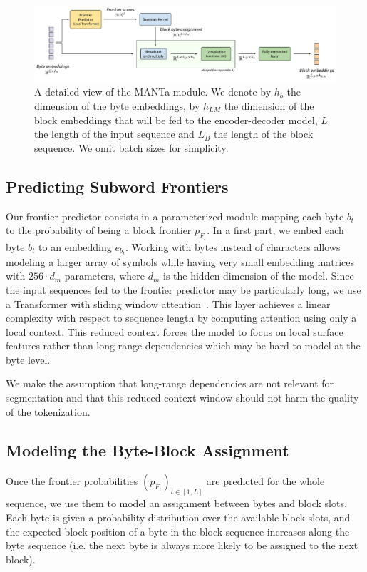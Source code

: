 \begin{figure}[!t]
    \centering
    \includegraphics[width=0.9\linewidth]{sources/part_2/manta/images/MANTa_Tokenization_Module.pdf}
    \caption{A detailed view of the MANTa module. We denote by $h_b$ the dimension of the byte embeddings, by $h_{LM}$ the dimension of the block embeddings that will be fed to the encoder-decoder model, $L$ the length of the input sequence and $L_B$ the length of the block sequence. We omit batch sizes for simplicity.}
    \label{fig:detailled_diagram}
\end{figure}

\subsection{Predicting Subword Frontiers}
\label{sec:frontpred}
Our frontier predictor consists in a parameterized module mapping each byte $b_t$ to the probability of being a block frontier $p_{F_t}$. In a first part, we embed each byte $b_t$ to an embedding $e_{b_t}$. Working with bytes instead of characters allows modeling a larger array of symbols while having very small embedding matrices with $256\cdot d_m$ parameters, where $d_m$ is the hidden dimension of the model. Since the input sequences fed to the frontier predictor may be particularly long, we use a Transformer with sliding window attention~\citep{beltagy2020longformer}. This layer achieves a linear complexity with respect to sequence length by computing attention using only a local context. This reduced context forces the model to focus on local surface features rather than long-range dependencies which may be hard to model at the byte level.

We make the assumption that long-range dependencies are not relevant for segmentation and that this reduced context window should not harm the quality of the tokenization.


\subsection{Modeling the Byte-Block Assignment}
\label{ssec:manta_maths}
Once the frontier probabilities $(p_{F_t})_{t \in [1, L]}$ are predicted for the whole sequence, we use them to model an assignment between bytes and block slots. Each byte is given a probability distribution over the available block slots, and the expected block position of a byte in the block sequence increases along the byte sequence (i.e. the next byte is always more likely to be assigned to the next block).

